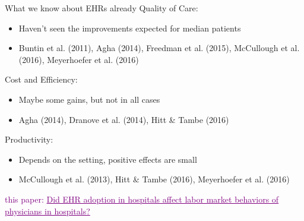 \documentclass[notes,11pt, aspectratio=169]{beamer}
\begin{document}
\begin{frame}{What we know about EHRs already}
Quality of Care:
\begin{itemize}
    \item Haven't seen the improvements expected for median patients
    \item \scriptsize Buntin et al. (2011), Agha (2014), Freedman et al. (2015), McCullough et al. (2016), Meyerhoefer et al. (2016)
\end{itemize}

\vspace{6mm}

Cost and Efficiency:
\begin{itemize}
    \item Maybe some gains, but not in all cases
    \item \scriptsize Agha (2014), Dranove et al. (2014), Hitt \& Tambe (2016)
\end{itemize}

\vspace{6mm}

Productivity:
\begin{itemize}
    \item Depends on the setting, positive effects are small
    \item \scriptsize McCullough et al. (2013), Hitt \& Tambe (2016), Meyerhoefer et al. (2016)
\end{itemize}    

\vspace{3mm}
\pause
\textcolor{purple}{this paper: \underline{Did EHR adoption in hospitals affect labor market behaviors of physicians in hospitals?}}
\end{frame}
\end{document}
